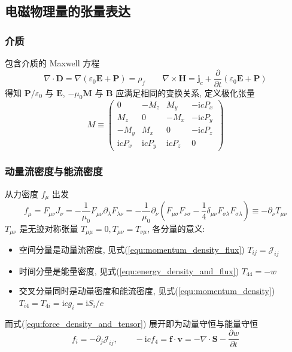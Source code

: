 \documentclass[12pt,a4paper]{article}%
\numberwithin{equation}{section}%
\renewcommand*{\vec}[1]{\bm{#1}}%
\newcommand\mi{\mathrm{i}}
\begin{document}
\subsection{电磁物理量的张量表达} %
\label{sub:tensor_express_of_EMF}
\subsubsection{介质} %
\label{ssub:medium_under_relativity}
包含介质的 Maxwell 方程
\begin{equation}
    \nabla\cdot\vec D = \nabla(\varepsilon_0\vec E + \vec P) = \rho_f \qquad
    \nabla\times\vec H = \vec j_c + \frac{\partial}{\partial t}(\varepsilon_0\vec E + \vec P)
\end{equation}
得知 $\vec P/\varepsilon_0$ 与 $\vec E$, $-\mu_0\vec M$ 与 $\vec B$ 应满足相同的变换关系, 定义极化张量
\begin{equation}
    M \equiv \begin{pmatrix}
        0        & -M_z      &  M_y      & -\mi cP_x \\
        M_z      &  0        & -M_x      & -\mi cP_y \\
       -M_y      &  M_x      &  0        & -\mi cP_z \\
        \mi cP_x &  \mi cP_y &  \mi cP_z &  0
    \end{pmatrix}
\end{equation}
\subsubsection{动量流密度与能流密度} %
\label{ssub:dynamic_density}
从力密度 $f_\mu$ 出发
\begin{equation}\label{equ:force_density_and_tensor}
    f_\mu = F_{\mu\nu}J_\nu = -\frac 1{\mu_0}F_{\mu\nu}\partial_\lambda F_{\lambda\nu}
     = -\frac 1{\mu_0}\partial_\nu\left(F_{\mu\sigma}F_{\nu\sigma} - \frac 14\delta_{\mu\nu}F_{\sigma\lambda}F_{\sigma\lambda}\right) \equiv -\partial_\nu T_{\mu\nu}
\end{equation}
$T_{\mu\nu}$ 是无迹对称张量 $T_{\mu\mu} = 0, T_{\mu\nu} =T_{\nu\mu}$, 各分量的意义:
\begin{itemize}
    \item 空间分量是动量流密度, 见式(\ref{equ:momentum_density_flux}) $T_{ij} = \mathcal J_{ij}$
    \item 时间分量是能量密度, 见式(\ref{equ:energy_density_and_flux}) $T_{44} = -w$
    \item 交叉分量同时是动量密度和能流密度, 见式(\ref{equ:momentum_density}) $T_{i4} = T_{4i} = \mi c g_i = \mi S_i/c$
\end{itemize}
而式(\ref{equ:force_density_and_tensor}) 展开即为动量守恒与能量守恒
\begin{equation}
    f_i = -\partial_j\mathcal J_{ij},\qquad
    -\mi c f_4 =\vec f\cdot\vec v = -\nabla\cdot\vec S - \frac{\partial w}{\partial t}
\end{equation}
\end{document}
